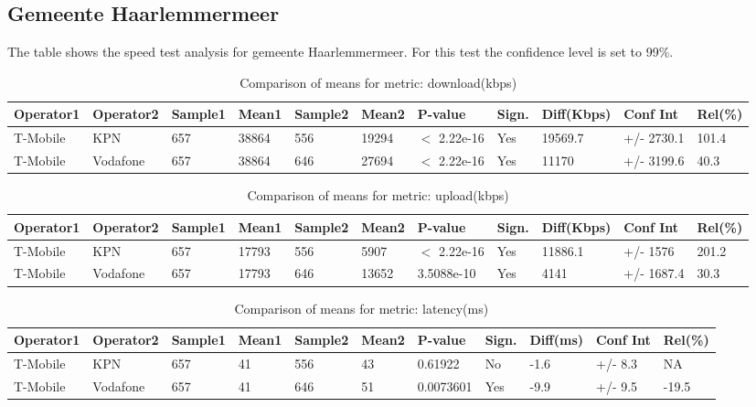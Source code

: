 \documentclass[]{article}
\begin{document}
\normalsize

\newpage

\subsection{Gemeente Haarlemmermeer}\label{gemeente-haarlemmermeer}

The table shows the speed test analysis for gemeente Haarlemmermeer. For
this test the confidence level is set to 99\%.

\begin{table}[ht]
\centering
{\footnotesize
\begin{tabular}{lllllllllll}
  \hline
Operator1 & Operator2 & Sample1 & Mean1 & Sample2 & Mean2 & P-value & Sign. & Diff(Kbps) & Conf Int & Rel(\%) \\ 
  \hline
T-Mobile & KPN & 657 & 38864 & 556 & 19294 & $<$ 2.22e-16 & Yes & 19569.7 & +/- 2730.1 & 101.4 \\ 
  T-Mobile & Vodafone & 657 & 38864 & 646 & 27694 & $<$ 2.22e-16 & Yes & 11170 & +/- 3199.6 & 40.3 \\ 
   \hline
\end{tabular}
}
\caption{Comparison of means for metric: download(kbps)} 
\end{table}

\begin{table}[ht]
\centering
{\footnotesize
\begin{tabular}{lllllllllll}
  \hline
Operator1 & Operator2 & Sample1 & Mean1 & Sample2 & Mean2 & P-value & Sign. & Diff(Kbps) & Conf Int & Rel(\%) \\ 
  \hline
T-Mobile & KPN & 657 & 17793 & 556 & 5907 & $<$ 2.22e-16 & Yes & 11886.1 & +/- 1576 & 201.2 \\ 
  T-Mobile & Vodafone & 657 & 17793 & 646 & 13652 & 3.5088e-10 & Yes & 4141 & +/- 1687.4 & 30.3 \\ 
   \hline
\end{tabular}
}
\caption{Comparison of means for metric: upload(kbps)} 
\end{table}

\begin{table}[ht]
\centering
{\footnotesize
\begin{tabular}{lllllllllll}
  \hline
Operator1 & Operator2 & Sample1 & Mean1 & Sample2 & Mean2 & P-value & Sign. & Diff(ms) & Conf Int & Rel(\%) \\ 
  \hline
T-Mobile & KPN & 657 & 41 & 556 & 43 & 0.61922 & No & -1.6 & +/- 8.3 & NA \\ 
  T-Mobile & Vodafone & 657 & 41 & 646 & 51 & 0.0073601 & Yes & -9.9 & +/- 9.5 & -19.5 \\ 
   \hline
\end{tabular}
}
\caption{Comparison of means for metric: latency(ms)} 
\end{table}
\end{document}
